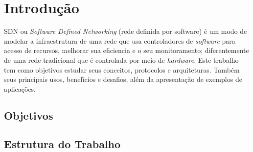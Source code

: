 \chapter{Introdução}
\label{cap:intro}

SDN ou \textit{Software Defined Networking} (rede definida por software) é um modo de modelar a infraestrutura de uma rede que usa
controladores de \textit{software} para acesso de recursos, melhorar sua eficiencia e o seu monitoramento; diferentemente de uma rede
tradicional que é controlada por meio de \textit{hardware}. Este trabalho tem como objetivos estudar seus conceitos, protocolos e
arquiteturas. Também seus principais usos, benefícios e desafios, além da apresentação de exemplos de aplicações.

\section{Objetivos}
\label{sec:objetivos}

\lipsum[2]

\section{Estrutura do Trabalho}
\label{sec:estrutura}

\lipsum[1]
